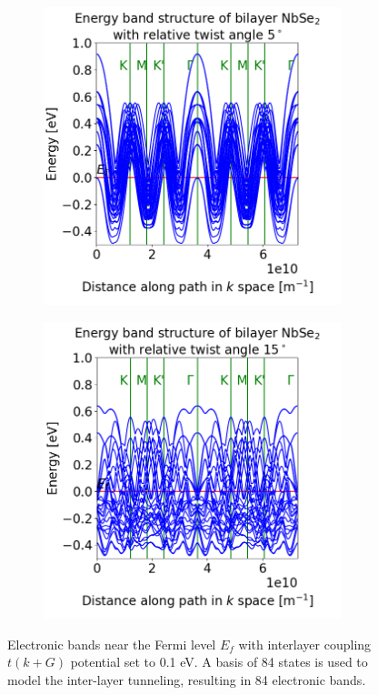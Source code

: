 \documentclass[12pt]{report} %
\begin{document}
\begin{figure}[t!]
\centering
  \begin{subfigure}[t]{0.45\textwidth}
    \centering
    \includegraphics[width=0.95\textwidth]{bilayer_bands_5_coupled.png}
    \caption{
    }
    \label{bilayer_bands_5_coupled}
  \end{subfigure}
  \hfill
  \begin{subfigure}[t]{0.45\textwidth}
    \centering
    \includegraphics[width=0.95\textwidth]{bilayer_bands_15_coupled.png}
    \caption{
    }
    \label{bilayer_bands_15_coupled}
  \end{subfigure}
  \caption{Electronic bands near the Fermi level $E_f$ with interlayer coupling $t(k+G)$ potential set to 0.1 eV. A basis of 84 states is used to model the inter-layer tunneling, resulting in 84 electronic bands.}
  \label{bilayer_bands_coupled}
\end{figure}
\end{document}
